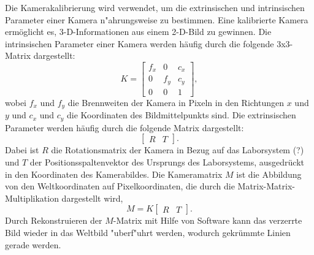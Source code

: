 \documentclass[arbeit=studie,oneside,BCOR=12mm]{ArbeitRST}
\begin{document}
Die Kamerakalibrierung wird verwendet, um die extrinsischen und intrinsischen
Parameter einer Kamera n"ahrungsweise zu bestimmen. Eine kalibrierte Kamera ermöglicht es,
3-D-Informationen aus einem 2-D-Bild zu gewinnen. Die intrinsischen Parameter
einer Kamera werden häufig durch die folgende 3x3-Matrix dargestellt:
\begin{equation} 
    K = 
    \begin{bmatrix} 
        f_x & 0 & c_x\\ 
        0 & f_y & c_y\\ 
        0 & 0 & 1
    \end{bmatrix}, 
\end{equation} 
wobei $f_x$ und $f_y$ die Brennweiten der Kamera in Pixeln in den
Richtungen $x$ und $y$ und $c_x$ und $c_y$ die Koordinaten des Bildmittelpunkts
sind. Die extrinsischen Parameter werden häufig durch die folgende Matrix
dargestellt: 
\begin{equation}
    \begin{bmatrix} R & T \end{bmatrix}. 
\end{equation} 
Dabei ist $R$ die Rotationsmatrix der Kamera in Bezug auf das Laborsystem (?) und $T$
der Positionsspaltenvektor des Ursprungs des Laborsystems, ausgedrückt in den
Koordinaten des Kamerabildes. Die Kameramatrix $M$ ist die Abbildung von
den Weltkoordinaten auf Pixelkoordinaten, die durch die
Matrix-Matrix-Multiplikation dargestellt wird, 
\begin{equation} 
    M = K 
    \begin{bmatrix} 
        R & T
    \end{bmatrix}. 
\end{equation} 
Durch Rekonstruieren der $M$-Matrix mit Hilfe von Software kann das verzerrte
Bild wieder in das Weltbild "uberf"uhrt werden, wodurch gekrümmte Linien gerade
werden. \\
\end{document}
